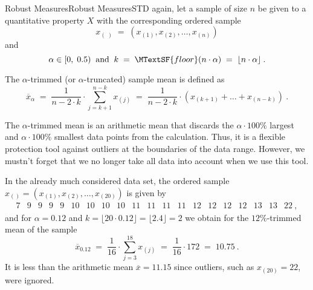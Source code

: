 \begin{MXContent}{Robust Measures}{Robust Measures}{STD}
again, let a sample of size $n$ be given to a quantitative property $X$ with the corresponding 
ordered sample  
$$
x_{(\; )}\;=\;(x_{(1)},x_{(2)},\ldots ,x_{(n)})
$$
and
$$
\alpha \in [0,\;0.5)\;\; \text{and}\;\;k\;=\;\MTextSF{floor}(n\cdot \alpha) \;= \;\lfloor n\cdot \alpha \rfloor \: .
$$

\begin{MInfo}
The $\alpha$-trimmed (or $\alpha$-truncated) sample mean is defined as
$$
\overline{x}_{\alpha}\;=\;
\frac{1}{n-2\cdot k} \cdot \sum\limits_{j=k+1}^{n-k}x_{(j)}\;=\; \frac{1}{n-2\cdot k}\cdot \left(x_{(k+1)}+ \ldots + x_{(n-k)} \right)\: .
$$
\end{MInfo}

The $\alpha$-trimmed mean is an arithmetic mean that discards the $\alpha \cdot 100\%$ largest 
and $\alpha \cdot 100\%$ smallest data points from the calculation. Thus, it is a flexible protection tool 
against outliers at the boundaries of the data range. However, we mustn't forget that we no longer take all data into account when we use this tool.

\begin{MExample}
In the already much considered data set, the ordered sample 
 $x_{()}=(x_{(1)},x_{(2)},\ldots ,x_{(20)})$ is given by 
$$
\begin{array}{cccccccccccccccccccc} 7 & 9 & 9 & 9 & 9 & 10 & 10 & 10 & 10 & 11 & 11 & 11 & 11 & 12 & 12 & 12 & 12 & 13 & 13 & 22 \: ,\end{array}
$$
and for
$\alpha = 0.12$ and $k=\lfloor 20\cdot 0.12 \rfloor = \lfloor 2.4 \rfloor =2$ we obtain for the $12\%$-trimmed mean of the sample
$$
\overline{x}_{0.12} \;=\; \frac{1}{16}\cdot \sum\limits_{j=3}^{18}x_{(j)}\;=\; \frac{1}{16}\cdot 172\;=\;10.75\: .
$$
It is less than the arithmetic mean $\overline{x}=11.15$ since outliers, such as $x_{(20)}=22$, were ignored.
\end{MExample}

\end{MXContent}

